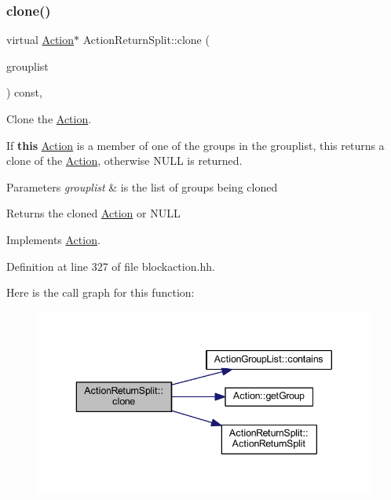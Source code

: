 \subsubsection{\texorpdfstring{clone()}{clone()}}
{\footnotesize\ttfamily virtual \mbox{\hyperlink{class_action}{Action}}$\ast$ Action\+Return\+Split\+::clone (\begin{DoxyParamCaption}\item[{const \mbox{\hyperlink{class_action_group_list}{Action\+Group\+List}} \&}]{grouplist }\end{DoxyParamCaption}) const\hspace{0.3cm}{\ttfamily [inline]}, {\ttfamily [virtual]}}



Clone the \mbox{\hyperlink{class_action}{Action}}. 

If {\bfseries{this}} \mbox{\hyperlink{class_action}{Action}} is a member of one of the groups in the grouplist, this returns a clone of the \mbox{\hyperlink{class_action}{Action}}, otherwise N\+U\+LL is returned. 
\begin{DoxyParams}{Parameters}
{\em grouplist} & is the list of groups being cloned \\
\hline
\end{DoxyParams}
\begin{DoxyReturn}{Returns}
the cloned \mbox{\hyperlink{class_action}{Action}} or N\+U\+LL 
\end{DoxyReturn}


Implements \mbox{\hyperlink{class_action_af8242e41d09e5df52f97df9e65cc626f}{Action}}.



Definition at line 327 of file blockaction.\+hh.

Here is the call graph for this function\+:
\nopagebreak
\begin{figure}[H]
\begin{center}
\leavevmode
\includegraphics[width=343pt]{class_action_return_split_afa7ea727f756deda567aa1f87bdfe28b_cgraph}
\end{center}
\end{figure}


